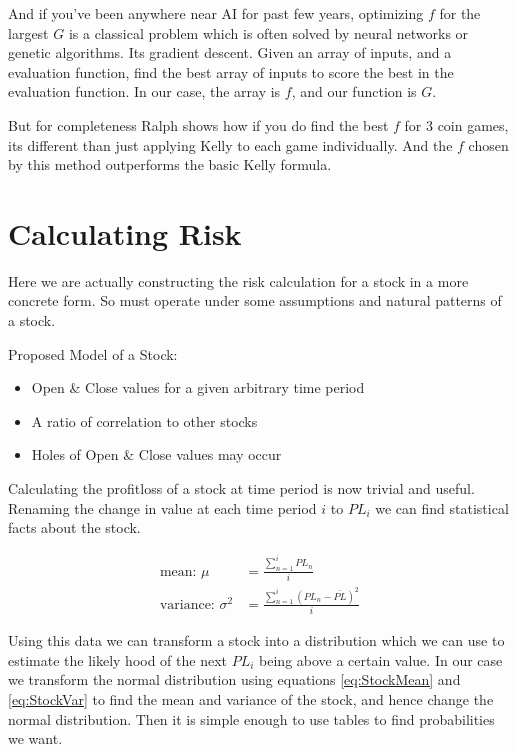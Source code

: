 \documentclass[12pt]{article}
\begin{document}
    And if you've been anywhere near AI for past few years, optimizing \(f\) for the largest 
    \(G\) is a classical problem which is often solved by neural networks or genetic
    algorithms. Its gradient descent. Given an array of inputs, and a evaluation function,
    find the best array of inputs to score the best in the evaluation function. In our case,
    the array is \(f\), and our function is \(G\).

    But for completeness Ralph shows how if you do find the best \(f\) for 3 coin
    games, its different than just applying Kelly to each game individually. And the \(f\)
    chosen by this method outperforms the basic Kelly formula.\cite{Ralph} 

\section{Calculating Risk}

    Here we are actually constructing the risk calculation for a stock in a more concrete form.
    So must operate under some assumptions and natural patterns of a stock. 

    Proposed Model of a Stock: 
    \begin{itemize}
        \item{Open {\&} Close values for a given arbitrary time period}
        \item{A ratio of correlation to other stocks}
        \item{Holes of Open {\&} Close values may occur}
    \end{itemize}

    Calculating the profit{\/}loss of a stock at time period is now trivial and useful.
    Renaming the change in value at each time period \(i\) to \(PL_i\) we can find
    statistical facts about the stock.

    \begin{align}
        \text{mean: }
            \mu &= \frac{\sum^{i}_{n=1} PL_n}{i} \label{eq:StockMean} \\
        \text{variance: } 
            \sigma^2 &= \frac{\sum^{i}_{n=1} (PL_n - \bar{PL})^2}{i} \label{eq:StockVar}
    \end{align}

    Using this data we can transform a stock into a distribution which we can use to estimate
    the likely hood of the next \(PL_i\) being above a certain value. In our case we transform
    the normal distribution using equations \ref{eq:StockMean} and \ref{eq:StockVar} to find
    the mean and variance of the stock, and hence change the normal distribution. Then it is
    simple enough to use tables to find probabilities we want.
\end{document}
